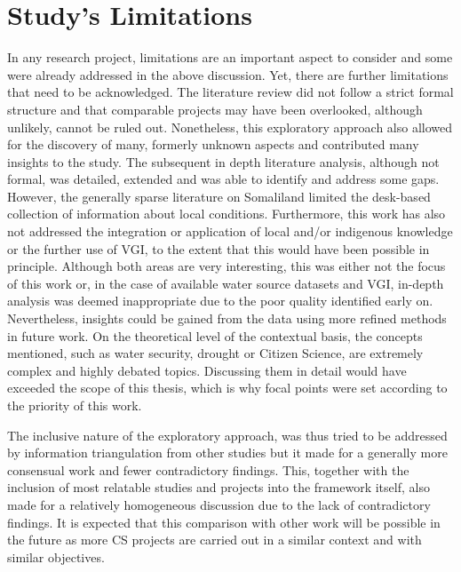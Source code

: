 \section{Study's Limitations}
In any research project, limitations are an important aspect to consider and some were already addressed in the above discussion. Yet, there are further limitations that need to be acknowledged. The literature review did not follow a strict formal structure and that comparable projects may have been overlooked, although unlikely, cannot be ruled out. Nonetheless, this exploratory approach also allowed for the discovery of many, formerly unknown aspects and contributed many insights to the study. The subsequent in depth literature analysis, although not formal, was detailed, extended and was able to identify and address some gaps. However, the generally sparse literature on Somaliland limited the desk-based collection of information about local conditions. Furthermore, this work has also not addressed the integration or application of local and/or indigenous knowledge or the further use of VGI, to the extent that this would have been possible in principle. Although both areas are very interesting, this was either not the focus of this work or, in the case of available water source datasets and VGI, in-depth analysis was deemed inappropriate due to the poor quality identified early on. Nevertheless, insights could be gained from the data using more refined methods in future work. On the theoretical level of the contextual basis, the concepts mentioned, such as water security, drought or Citizen Science, are extremely complex and highly debated topics. Discussing them in detail would have exceeded the scope of this thesis, which is why focal points were set according to the priority of this work.

The inclusive nature of the exploratory approach, was thus tried to be addressed by information triangulation from other studies but it made for a generally more consensual work and fewer contradictory findings. This, together with the inclusion of most relatable studies and projects into the framework itself, also made for a relatively homogeneous discussion due to the lack of contradictory findings. It is expected that this comparison with other work will be possible in the future as more CS projects are carried out in a similar context and with similar objectives.

